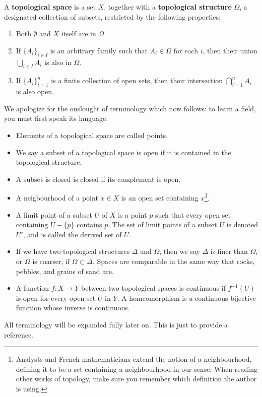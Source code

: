 \begin{definition}
    A {\bf topological space} is a set $X$, together with a {\bf topological structure} $\Omega$, a designated collection of subsets, restricted by the following properties:
    \begin{enumerate}
        \item Both $\emptyset$ and $X$ itself are in $\Omega$
        \item If $\{A_i\}_{i \in I}$ is an arbitrary family such that $A_i \in \Omega$ for each $i$, then their union $\bigcup_{i \in I} A_i$ is also in $\Omega$.
        \item If $\{A_i\}_{i = 1}^n$ is a finite collection of open sets, then their intersection $\bigcap_{i = 1}^n A_i$ is also open.
    \end{enumerate}
    We apologize for the onslought of terminology which now follows: to learn a field, you must first speak its language.
    \begin{itemize}
        \item Elements of a topological space are called points.
        \item We say a subset of a topological space is open if it is contained in the topological structure.
        \item A subset is closed is closed if its complement is open.
        \item A neigbourhood of a point $x \in X$ is an open set containing $x$\footnote{Analysts and French mathematicians extend the notion of a neighbourhood, defining it to be a set containing a neighbourhood in our sense. When reading other works of topology, make sure you remember which definition the author is using.}.
        \item A limit point of a subset $U$ of $X$ is a point $p$ such that every open set containing $U - \{p\}$ contains $p$. The set of limit points of a subset $U$ is denoted $U'$, and is called the derived set of $U$.
        \item If we have two topological structures $\Delta$ and $\Omega$, then we say $\Delta$ is finer than $\Omega$, or $\Omega$ is coarser, if $\Omega \subset \Delta$. Spaces are comparable in the same way that rocks, pebbles, and grains of sand are.
        \item A function $f:X \to Y$ between two topological spaces is continuous if $f^{-1}(U)$ is open for every open set $U$ in $Y$. A homeomorphism is a continuous bijective function whose inverse is continuous.
    \end{itemize}
    All terminology will be expanded fully later on. This is just to provide a reference.
\end{definition}

